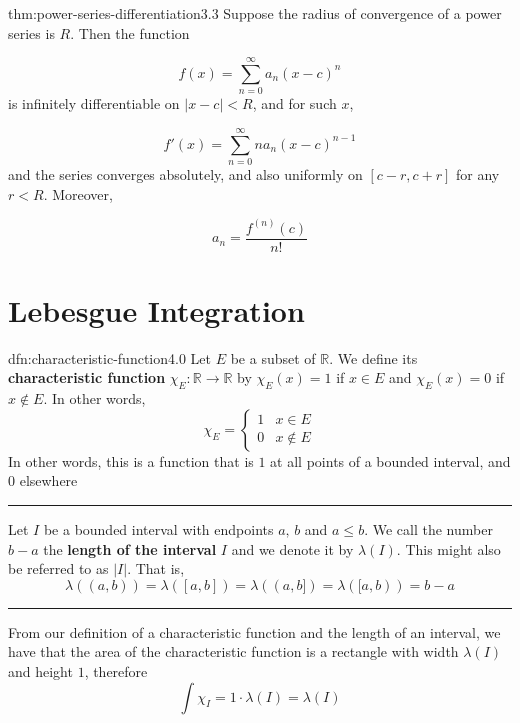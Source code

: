 \documentclass[landscape, 8pt]{extarticle}
\begin{document}
\begin{multicols}{3}
\vspace{-5pt}
\begin{thm}{thm:power-series-differentiation}{3.3}
	Suppose the radius of convergence of a power series is $R$. Then the function

	\vspace{-5pt}
	\[f(x)=\sum_{n=0}^{\infty} a_{n}(x-c)^{n}\]
	is infinitely differentiable on $\lvert x-c \rvert<R$, and for such $x$,
	\vspace{-5pt}

	\[f'(x)=\sum_{n=0}^{\infty} na_{n}(x-c)^{n-1}\]
	and the series converges absolutely, and also uniformly on $[c-r,c+r]$ for any $r<R$. Moreover,

	\vspace{-5pt}
	\[a_{n}=\frac{f^{(n)}(c)}{n!}\]
\end{thm}



\newpage
\section{Lebesgue Integration}

\begin{dfn}{dfn:characteristic-function}{4.0}
	Let $E$ be a subset of $\mathbb{R}$. We define its \textbf{characteristic function} $\chi_{E}:\mathbb{R}\to\mathbb{R}$ by $\chi_{E}(x)=1$ if $x\in E$ and $\chi_{E}(x)=0$ if $x\not\in E$. In other words,
	\[\chi_{E}=\begin{cases}
	1&x\in E \\
	0 & x\not\in E
	\end{cases}\]
	In other words, this is a function that is $1$ at all points of a bounded interval, and $0$ elsewhere

	\noindent\rule{\textwidth}{0.2pt}
	
	Let $I$ be a bounded interval with endpoints $a,\,b$ and $a\le b$. We call the number $b-a$ the \textbf{length of the interval} $I$ and we denote it by $\lambda(I)$. This might also be referred to as $\lvert I \rvert$. That is,
	\[\lambda((a,b)) = \lambda([a,b]) = \lambda((a,b]) = \lambda([a,b)) = b-a\]

	\noindent\rule{\textwidth}{0.2pt}
	From our definition of a characteristic function and the length of an interval, we have that the area of the characteristic function is a rectangle with width $\lambda(I)$ and height $1$, therefore
	\[\int \chi_{I} = 1 \cdot \lambda(I) = \lambda(I)\]
\end{dfn}


\end{multicols}
\end{document}
